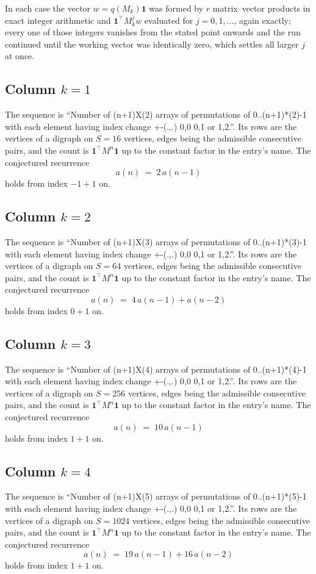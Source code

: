 \documentclass[11pt,a4paper]{article}
\theoremstyle{plain}
\theoremstyle{definition}
\begin{document}
In each case the vector $w=q(M_k)\mathbf{1}$ was formed by $r$ matrix--vector products in
exact integer arithmetic and $\mathbf{1}^{\!\top}M_k^{j}w$ evaluated for $j=0,1,\dots$,
again exactly; every one of those integers vanishes from the stated point onwards and the run
continued until the working vector was identically zero, which settles all larger $j$ at once.

\subsection*{Column $k$$=1$}
The sequence is ``Number of (n+1)X(2) arrays of permutations of 0..(n+1)*(2)-1 with each element having index change +-(.,.) 0,0 0,1 or 1,2.''. Its rows are the vertices of a digraph on
$S=16$ vertices, edges being the admissible consecutive pairs, and the count is
$\mathbf{1}^{\!\top}M^{n}\mathbf{1}$ up to the constant factor in the entry's name.
The conjectured recurrence
\[
a(n)\;=\;2\,a(n-1)
\]
holds from index $-1+1$ on.

\subsection*{Column $k$$=2$}
The sequence is ``Number of (n+1)X(3) arrays of permutations of 0..(n+1)*(3)-1 with each element having index change +-(.,.) 0,0 0,1 or 1,2.''. Its rows are the vertices of a digraph on
$S=64$ vertices, edges being the admissible consecutive pairs, and the count is
$\mathbf{1}^{\!\top}M^{n}\mathbf{1}$ up to the constant factor in the entry's name.
The conjectured recurrence
\[
a(n)\;=\;4\,a(n-1) + a(n-2)
\]
holds from index $0+1$ on.

\subsection*{Column $k$$=3$}
The sequence is ``Number of (n+1)X(4) arrays of permutations of 0..(n+1)*(4)-1 with each element having index change +-(.,.) 0,0 0,1 or 1,2.''. Its rows are the vertices of a digraph on
$S=256$ vertices, edges being the admissible consecutive pairs, and the count is
$\mathbf{1}^{\!\top}M^{n}\mathbf{1}$ up to the constant factor in the entry's name.
The conjectured recurrence
\[
a(n)\;=\;10\,a(n-1)
\]
holds from index $1+1$ on.

\subsection*{Column $k$$=4$}
The sequence is ``Number of (n+1)X(5) arrays of permutations of 0..(n+1)*(5)-1 with each element having index change +-(.,.) 0,0 0,1 or 1,2.''. Its rows are the vertices of a digraph on
$S=1024$ vertices, edges being the admissible consecutive pairs, and the count is
$\mathbf{1}^{\!\top}M^{n}\mathbf{1}$ up to the constant factor in the entry's name.
The conjectured recurrence
\[
a(n)\;=\;19\,a(n-1) + 16\,a(n-2)
\]
holds from index $1+1$ on.
\end{document}
